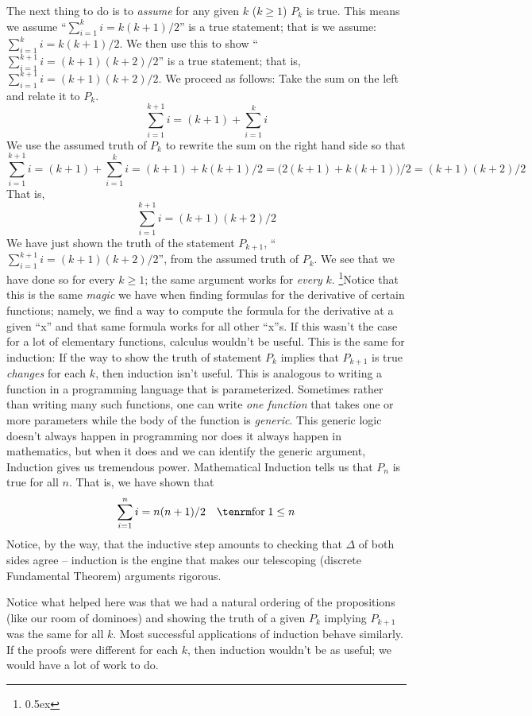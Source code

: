 The next thing to do is to {\it assume\/} for any given $k$ ($k \ge 1$) $P_k$ is true. This 
means we assume ``$\sum_{i=1}^k i = k(k+1)/2$'' is a true statement; that is we assume: $\sum_{i=1}^k i = k(k+1)/2$.
We then use this to show 
``$\sum_{i=1}^{k+1} i = (k+1)(k+2)/2$'' is a true statement; that is, $\sum_{i=1}^{k+1} i = (k+1)(k+2)/2$. 
We proceed as follows: Take the sum
on the left and relate it to $P_k$.
$$
\sum_{i=1}^{k+1} i = (k+1) + \sum_{i=1}^{k} i 
$$
We use the assumed truth of $P_k$ to rewrite the sum on the right hand side so 
that 
$$
\sum_{i=1}^{k+1} i = (k+1) + \sum_{i=1}^{k} i = (k+1) + k(k+1)/2 = 
\bigl(2(k+1) + k(k+1) \bigr)/2 = (k+1)(k+2)/2
$$
That is,
$$
\sum_{i=1}^{k+1} i = (k+1)(k+2)/2
$$
We have just shown the truth of the statement  $P_{k+1}$,  ``$\sum_{i=1}^{k+1} i = (k+1)(k+2)/2$'', 
from the assumed truth of $P_k$. We see that
we have done so for every $k \ge 1$; the same argument works for {\it every\/} $k$.%
\footnote{\kern 0.5pt \raise 0.5ex \hbox{\dag}}{Notice that this is the same {\it magic\/} we have when finding formulas for the derivative of
certain functions; namely, we find a way to compute the formula for the derivative at a given ``x'' and that same formula works 
for all other ``x''s. If this wasn't the case for a lot of elementary functions, calculus wouldn't be useful. This is the same for induction:
If the way to show the truth of statement $P_k$ implies that $P_{k+1}$ is true {\it changes} for each $k$, then induction 
isn't useful. This is analogous to writing a function in a programming language that is parameterized. Sometimes rather than writing
many such functions, one can write {\it one function\/} that takes one or more parameters while the body of
the function is {\it generic\/}. This generic logic doesn't
always happen in programming nor does it always happen in mathematics, but when it does and we can identify the generic argument,
Induction gives us tremendous power.}
Mathematical Induction tells us that $P_n$ is true for all $n$. That is, 
we have shown that 
$$
\sum_{i=1}^n i = n(n+1)/2 \quad {\rm for} \; 1 \le n
$$
Notice, by the way, that the inductive step amounts to checking that
$\Delta$ of both sides agree -- induction is the engine that makes our
telescoping (discrete Fundamental Theorem) arguments rigorous.

Notice what helped here was that we had a natural ordering of the propositions
(like our room of dominoes) and
showing the truth of a given $P_k$ implying $P_{k+1}$ was the same for all $k$. Most successful 
applications of induction behave similarly.
If the proofs were different for each $k$, then
induction wouldn't be as useful; we would have a lot of work to do.

